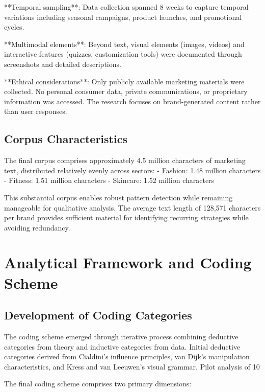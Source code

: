 **Temporal sampling**: Data collection spanned 8 weeks to capture temporal variations including seasonal campaigns, product launches, and promotional cycles.

**Multimodal elements**: Beyond text, visual elements (images, videos) and interactive features (quizzes, customization tools) were documented through screenshots and detailed descriptions.

**Ethical considerations**: Only publicly available marketing materials were collected. No personal consumer data, private communications, or proprietary information was accessed. The research focuses on brand-generated content rather than user responses.

\subsection{Corpus Characteristics}

The final corpus comprises approximately 4.5 million characters of marketing text, distributed relatively evenly across sectors:
- Fashion: 1.48 million characters
- Fitness: 1.51 million characters  
- Skincare: 1.52 million characters

This substantial corpus enables robust pattern detection while remaining manageable for qualitative analysis. The average text length of 128,571 characters per brand provides sufficient material for identifying recurring strategies while avoiding redundancy.

\section{Analytical Framework and Coding Scheme}
\label{sec:analytical_framework}

\subsection{Development of Coding Categories}

The coding scheme emerged through iterative process combining deductive categories from theory and inductive categories from data. Initial deductive categories derived from Cialdini's influence principles, van Dijk's manipulation characteristics, and Kress and van Leeuwen's visual grammar. Pilot analysis of 10%

The final coding scheme comprises two primary dimensions:

